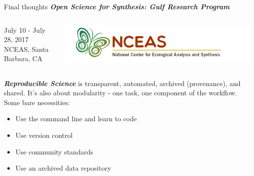 \documentclass[serif]{beamer}\usepackage[]{graphicx}\usepackage[]{color}
\newcommand{\emtxt}[1]{\textbf{\textit{#1}}}
\begin{document}
\begin{frame}[t]{Final thoughts}{}
{\large \emtxt{Open Science for Synthesis: Gulf Research Program}}
\begin{columns}
\begin{column}{0.5\textwidth}
July 10 - July 28, 2017\\
NCEAS, Santa Barbara, CA 
\end{column}
\begin{column}{0.5\textwidth}
\hfill \includegraphics[width = \textwidth]{fig/nceas_full.png}
\end{column}
\end{columns}
\vfill
\emtxt{Reproducible Science} is transparent, automated, archived (provenance), and shared. It's also about modularity - one task, one component of the workflow. 
\vfill
Some bare necessities: 
\begin{itemize}
\item Use the command line and learn to code
\item Use version control
\item Use community standards
\item Use an archived data repository
\end{itemize}
\vfill
\end{frame}
\end{document}

